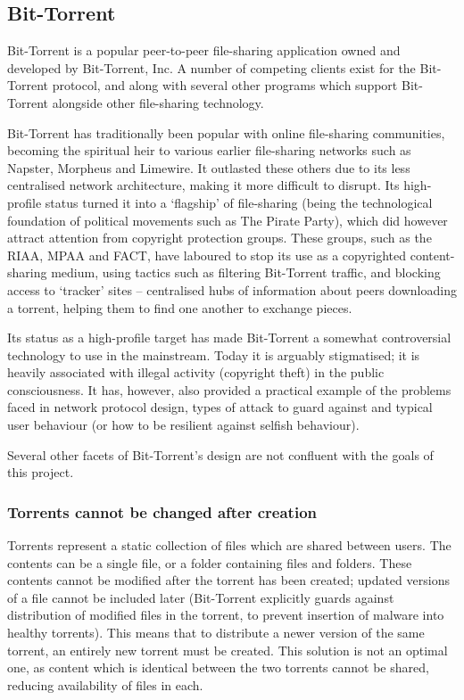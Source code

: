 \documentclass[12pt,a4paper,]{adreport}
\begin{document}
\subsection{Bit-Torrent}\label{bit-torrent}

Bit-Torrent is a popular peer-to-peer file-sharing application owned and
developed by Bit-Torrent, Inc. A number of competing clients exist for
the Bit-Torrent protocol, and along with several other programs which
support Bit-Torrent alongside other file-sharing technology.

Bit-Torrent has traditionally been popular with online file-sharing
communities, becoming the spiritual heir to various earlier file-sharing
networks such as Napster, Morpheus and Limewire. It outlasted these
others due to its less centralised network architecture, making it more
difficult to disrupt. Its high-profile status turned it into a
`flagship' of file-sharing (being the technological foundation of
political movements such as The Pirate Party), which did however attract
attention from copyright protection groups. These groups, such as the
RIAA, MPAA and FACT, have laboured to stop its use as a copyrighted
content-sharing medium, using tactics such as filtering Bit-Torrent
traffic, and blocking access to `tracker' sites -- centralised hubs of
information about peers downloading a torrent, helping them to find one
another to exchange pieces.

Its status as a high-profile target has made Bit-Torrent a somewhat
controversial technology to use in the mainstream. Today it is arguably
stigmatised; it is heavily associated with illegal activity (copyright
theft) in the public consciousness. It has, however, also provided a
practical example of the problems faced in network protocol design,
types of attack to guard against and typical user behaviour (or how to
be resilient against selfish behaviour).

Several other facets of Bit-Torrent's design are not confluent with the
goals of this project.

\subsubsection{Torrents cannot be changed after creation}\label{collection-contents-cannot-be-changed-after-torrent-creation}

Torrents represent a static collection of files which are shared between
users. The contents can be a single file, or a folder containing files
and folders. These contents cannot be modified after the torrent has
been created; updated versions of a file cannot be included later
(Bit-Torrent explicitly guards against distribution of modified files in
the torrent, to prevent insertion of malware into healthy torrents).
This means that to distribute a newer version of the same torrent, an
entirely new torrent must be created. This solution is not an optimal
one, as content which is identical between the two torrents cannot be
shared, reducing availability of files in each.
\end{document}
